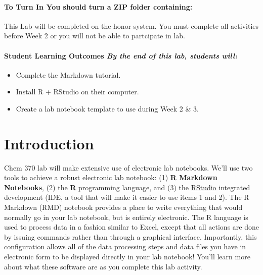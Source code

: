 \documentclass[]{tufte-book}
\providecommand{\tightlist}{%
  \setlength{\itemsep}{0pt}\setlength{\parskip}{0pt}}
\begin{document}
\hypertarget{to-turn-in-you-should-turn-a-zip-folder-containing}{%
\paragraph{\texorpdfstring{\textbf{To Turn In} \textbar{} You should turn a ZIP folder containing:}{To Turn In \textbar{} You should turn a ZIP folder containing:}}\label{to-turn-in-you-should-turn-a-zip-folder-containing}}

This Lab will be completed on the honor system. You must complete all activities before Week 2 or you will not be able to partcipate in lab.

\hypertarget{student-learning-outcomes-by-the-end-of-this-lab-students-will}{%
\paragraph{\texorpdfstring{\textbf{Student Learning Outcomes} \textbar{} \emph{By the end of this lab, students will:}}{Student Learning Outcomes \textbar{} By the end of this lab, students will:}}\label{student-learning-outcomes-by-the-end-of-this-lab-students-will}}

\begin{itemize}
\tightlist
\item
  Complete the Markdown tutorial.\\
\item
  Install R + RStudio on their computer.
\item
  Create a lab notebook template to use during Week 2 \& 3.
\end{itemize}

\hypertarget{r-intro}{%
\section*{Introduction}\label{r-intro}}

Chem 370 lab will make extensive use of electronic lab notebooks. We'll use two tools to achieve a robust electronic lab notebook: (1) \textbf{R Markdown Notebooks}, (2) the \textbf{R} programming language, and (3) the \href{https://www.google.com/url?sa=t\&rct=j\&q=\&esrc=s\&source=web\&cd=\&cad=rja\&uact=8\&ved=2ahUKEwictpuN2IvqAhVtl3IEHUhSCUUQFjAAegQIAhAC\&url=https\%3A\%2F\%2Frstudio.com\%2F\&usg=AOvVaw2mM_qCjo878d2q5bcC0XUS}{RStudio} integrated development (IDE, a tool that will make it easier to use items 1 and 2). The R Markdown (RMD) notebook provides a place to write everything that would normally go in your lab notebook, but is entirely electronic. The R language is used to process data in a fashion similar to Excel, except that all actions are done by issuing commands rather than through a graphical interface. Importantly, this configuration allows all of the data processing steps and data files you have in electronic form to be displayed directly in your lab notebook! You'll learn more about what these software are as you complete this lab activity.
\end{document}

